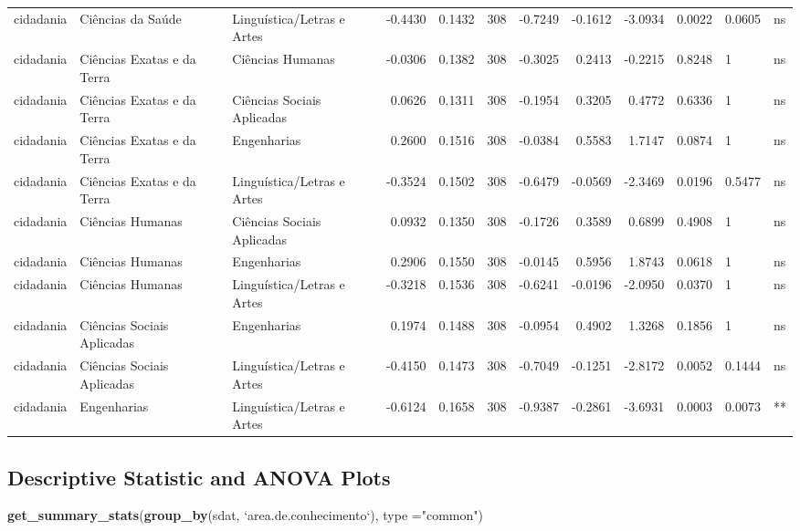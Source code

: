\documentclass[]{article}
\newenvironment{Shaded}{\begin{snugshade}}{\end{snugshade}}
\newcommand{\DataTypeTok}[1]{\textcolor[rgb]{0.13,0.29,0.53}{#1}}
\newcommand{\KeywordTok}[1]{\textcolor[rgb]{0.13,0.29,0.53}{\textbf{#1}}}
\newcommand{\NormalTok}[1]{#1}
\newcommand{\StringTok}[1]{\textcolor[rgb]{0.31,0.60,0.02}{#1}}
\begin{document}
\begin{longtable}[]{@{}lllrrrrrrrll@{}}
cidadania & Ciências da Saúde & Linguística/Letras e Artes & -0.4430 &
0.1432 & 308 & -0.7249 & -0.1612 & -3.0934 & 0.0022 & 0.0605 &
ns\tabularnewline
cidadania & Ciências Exatas e da Terra & Ciências Humanas & -0.0306 &
0.1382 & 308 & -0.3025 & 0.2413 & -0.2215 & 0.8248 & 1 &
ns\tabularnewline
cidadania & Ciências Exatas e da Terra & Ciências Sociais Aplicadas &
0.0626 & 0.1311 & 308 & -0.1954 & 0.3205 & 0.4772 & 0.6336 & 1 &
ns\tabularnewline
cidadania & Ciências Exatas e da Terra & Engenharias & 0.2600 & 0.1516 &
308 & -0.0384 & 0.5583 & 1.7147 & 0.0874 & 1 & ns\tabularnewline
cidadania & Ciências Exatas e da Terra & Linguística/Letras e Artes &
-0.3524 & 0.1502 & 308 & -0.6479 & -0.0569 & -2.3469 & 0.0196 & 0.5477 &
ns\tabularnewline
cidadania & Ciências Humanas & Ciências Sociais Aplicadas & 0.0932 &
0.1350 & 308 & -0.1726 & 0.3589 & 0.6899 & 0.4908 & 1 &
ns\tabularnewline
cidadania & Ciências Humanas & Engenharias & 0.2906 & 0.1550 & 308 &
-0.0145 & 0.5956 & 1.8743 & 0.0618 & 1 & ns\tabularnewline
cidadania & Ciências Humanas & Linguística/Letras e Artes & -0.3218 &
0.1536 & 308 & -0.6241 & -0.0196 & -2.0950 & 0.0370 & 1 &
ns\tabularnewline
cidadania & Ciências Sociais Aplicadas & Engenharias & 0.1974 & 0.1488 &
308 & -0.0954 & 0.4902 & 1.3268 & 0.1856 & 1 & ns\tabularnewline
cidadania & Ciências Sociais Aplicadas & Linguística/Letras e Artes &
-0.4150 & 0.1473 & 308 & -0.7049 & -0.1251 & -2.8172 & 0.0052 & 0.1444 &
ns\tabularnewline
cidadania & Engenharias & Linguística/Letras e Artes & -0.6124 & 0.1658
& 308 & -0.9387 & -0.2861 & -3.6931 & 0.0003 & 0.0073 &
**\tabularnewline
\bottomrule
\end{longtable}

\hypertarget{descriptive-statistic-and-anova-plots}{%
\subsection{Descriptive Statistic and ANOVA
Plots}\label{descriptive-statistic-and-anova-plots}}

\begin{Shaded}
\begin{Highlighting}[]
\KeywordTok{get_summary_stats}\NormalTok{(}\KeywordTok{group_by}\NormalTok{(sdat, }\StringTok{`}\DataTypeTok{area.de.conhecimento}\StringTok{`}\NormalTok{), }\DataTypeTok{type =}\StringTok{"common"}\NormalTok{)}
\end{Highlighting}
\end{Shaded}
\end{document}
